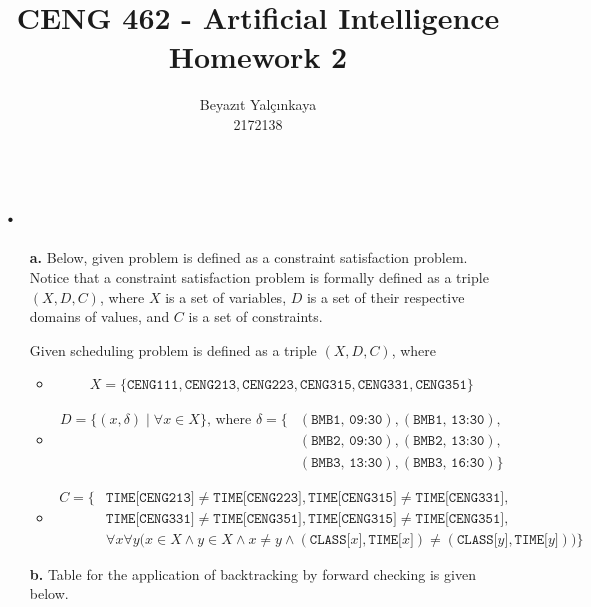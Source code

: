 \documentclass[12pt]{article}
\title{CENG 462 - Artificial Intelligence Homework 2}
\author{Beyazıt Yalçınkaya\\2172138}
\date{}
\newcommand{\RN}[1]{%
  \textup{\uppercase\expandafter{\romannumeral#1}}%
}
\begin{document}
\maketitle

\section*{\RN{1}.}
	\begin{itemize}
		\item[\textbf{a.}] Below, given problem is defined as a constraint satisfaction problem. Notice that a constraint satisfaction problem is formally defined as a triple $(X, D, C)$, where $X$ is a set of variables, $D$ is a set of their respective domains of values, and $C$ is a set of constraints.
		
		Given scheduling problem is defined as a triple $(X, D, C)$, where
			\begin{itemize}
				\item
					\begin{align*}
					X = \{\texttt{CENG111}, \texttt{CENG213}, \texttt{CENG223}, \texttt{CENG315}, \texttt{CENG331}, \texttt{CENG351}\}
					\end{align*}
				\item
					\begin{align*}
					D = \{(x, \delta) \mid \forall x \in X \}\text{, where }\delta = \{&(\texttt{BMB1, 09:30}), (\texttt{BMB1, 13:30}),\\
						&(\texttt{BMB2, 09:30}), (\texttt{BMB2, 13:30}),\\
						&(\texttt{BMB3, 13:30}), (\texttt{BMB3, 16:30})\}
					\end{align*}
				\item
					\begin{align*}
					C = \big\{&\texttt{TIME[CENG213]} \neq \texttt{TIME[CENG223]}, \texttt{TIME[CENG315]} \neq \texttt{TIME[CENG331]},\\
						&\texttt{TIME[CENG331]} \neq \texttt{TIME[CENG351]}, \texttt{TIME[CENG315]} \neq \texttt{TIME[CENG351]},\\
						&\forall x \forall y \big(x \in X \land y \in X \land x \neq y \land (\texttt{CLASS[$x$]}, \texttt{TIME[$x$]}) \neq (\texttt{CLASS[$y$]}, \texttt{TIME[$y$]})\big)\big\}
					\end{align*}
			\end{itemize}


		\item[\textbf{b.}] Table for the application of backtracking by forward checking is given below.


\end{itemize}
\end{document}
